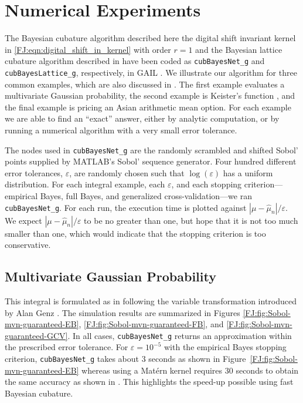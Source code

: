 \documentclass[graybox,footinfo]{svmult}
\newcommand{\abs}[1]{\left\lvert #1 \right\rvert} %
\newcommand{\JRNote}[1]{{\textcolor{green}{JR: #1}}}
\begin{document}
\section{Numerical Experiments}

\label{FJ:sec:NumExp}


The Bayesian cubature algorithm described here the digital shift invariant kernel in \eqref{FJ:eqn:digital_shift_in_kernel} with order $r=1$  and the Bayesian lattice cubature algorithm described in \cite{RatHic19a} have been coded as  \texttt{cubBayesNet\_g} and \texttt{cubBayesLattice\_g}, respectively, in GAIL \cite{ChoEtal21a}.  We illustrate our algorithm for three common examples, which are also discussed in \cite{RatHic19a}.  The first example evaluates a multivariate Gaussian probability, the second example is Keister's function \cite{Kei96}, and the final example is pricing an Asian arithmetic mean option.  For each example we are able to find an ``exact'' answer, either by analytic computation, or by running a numerical algorithm with a very small error tolerance.

The nodes used in \texttt{cubBayesNet\_g} are the randomly scrambled and shifted Sobol' points supplied by MATLAB's Sobol' sequence generator. Four hundred different error tolerances, $\varepsilon$, are randomly chosen such that $\log(\varepsilon)$ has a uniform distribution. 
For each integral example, each $\varepsilon$, and each stopping criterion---empirical Bayes, full Bayes, and generalized cross-validation---we ran \texttt{cubBayesNet\_g}.  For each run, the execution time is plotted against $\abs{\mu - \widehat{\mu}_n}/\varepsilon$.  We expect $\abs{\mu - \widehat{\mu}_n}/\varepsilon$ to be no greater than one, but hope that it is not too much smaller than one, which would indicate that the stopping criterion  is too conservative.

\subsection{Multivariate Gaussian Probability}

This integral is formulated as in \cite{RatHic19a} following the variable transformation introduced by Alan Genz \cite{Gen92}. The simulation results are summarized in Figures \ref{FJ:fig:Sobol-mvn-guaranteed-EB}, \ref{FJ:fig:Sobol-mvn-guaranteed-FB}, and \ref{FJ:fig:Sobol-mvn-guaranteed-GCV}.  In all cases, \texttt{cubBayesNet\_g} returns an approximation within the prescribed error tolerance. For  $\varepsilon=10^{-5}$ with the empirical Bayes stopping criterion, \texttt{cubBayesNet\_g} takes about 3 seconds as shown in Figure~\ref{FJ:fig:Sobol-mvn-guaranteed-EB} whereas using a Mat\'ern kernel requires 30 seconds to obtain the same accuracy as shown in \cite{RatHic19a}. This highlights the speed-up possible using fast Bayesian cubature.
\end{document}
